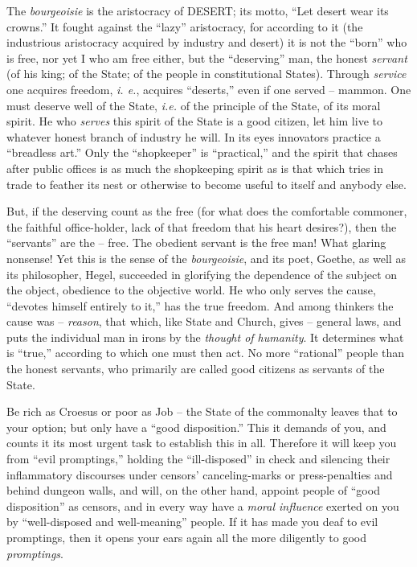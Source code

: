 \documentclass[12pt,a4paper]{book}
\begin{document}
The \textit{bourgeoisie} is the aristocracy of DESERT; its motto, ``Let 
desert wear its crowns.'' It fought against the ``lazy'' aristocracy, for 
according to it (the industrious aristocracy acquired by industry and desert) 
it is not the ``born'' who is free, nor yet I who am free either, but the 
``deserving'' man, the honest \textit{servant} (of his king; of the State; 
of the people in constitutional States). Through \textit{service} one acquires 
freedom, \textit{i. e.}, acquires ``deserts,'' even if one served -- mammon. 
One must deserve well of the State, \textit{i.e.} of the principle of the 
State, of its moral spirit. He who \textit{serves} this spirit of the State is 
a good citizen, let him live to whatever honest branch of industry he will. In 
its eyes innovators practice a ``breadless art.'' Only the ``shopkeeper'' 
is ``practical,'' and the spirit that chases after public offices is as much 
the shopkeeping spirit as is that which tries in trade to feather its nest or 
otherwise to become useful to itself and anybody else.

But, if the deserving count as the free (for what does the comfortable 
commoner, the faithful office-holder, lack of that freedom that his heart 
desires?), then the ``servants'' are the -- free. The obedient servant is 
the free man! What glaring nonsense! Yet this is the sense of the 
\textit{bourgeoisie}, and its poet, Goethe, as well as its philosopher, Hegel, 
succeeded in glorifying the dependence of the subject on the object, obedience 
to the objective world. He who only serves the cause, ``devotes himself 
entirely to it,'' has the true freedom. And among thinkers the cause was -- 
\textit{reason}, that which, like State and Church, gives -- general laws, and 
puts the individual man in irons by the \textit{thought of humanity}. It 
determines what is ``true,'' according to which one must then act. No more 
``rational'' people than the honest servants, who primarily are called good 
citizens as servants of the State.

Be rich as Croesus or poor as Job -- the State of the commonalty leaves that 
to your option; but only have a ``good disposition.'' This it demands of 
you, and counts it its most urgent task to establish this in all. Therefore it 
will keep you from ``evil promptings,'' holding the ``ill-disposed'' in 
check and silencing their inflammatory discourses under censors' 
canceling-marks or press-penalties and behind dungeon walls, and will, on the 
other hand, appoint people of ``good disposition'' as censors, and in every 
way have a \textit{moral influence} exerted on you by ``well-disposed and 
well-meaning'' people. If it has made you deaf to evil promptings, then it 
opens your ears again all the more diligently to good \textit{promptings}.
\end{document}
